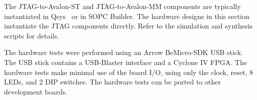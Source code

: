 \documentclass[10pt,twoside]{article}
\begin{document}
The JTAG-to-Avalon-ST and JTAG-to-Avalon-MM components are typically
instantiated in Qsys~\cite{Altera_Qsys_Documentation} or in SOPC 
Builder\cite{Altera_SOPC_Builder_Documentation}.
%
The hardware designs in this section instantiate the
JTAG components directly. Refer to the simulation and synthesis
scripts for details.

The hardware tests were performed using an Arrow BeMicro-SDK
USB stick. The USB stick contains a USB-Blaster interface and
a Cyclone IV FPGA. The hardware tests make minimal use of the
board I/O, using only the clock, reset, 8 LEDs, and 2 DIP switches.
The hardware tests can be ported to other development boards.

%
\end{document}
